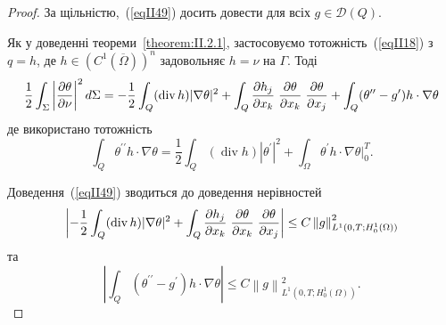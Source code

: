 \begin{proof}
\label{proof:II.lemma.2.2}
За щільністю,~(\ref{eqII49}) досить довести для всіх $g \in \mathcal{D}(Q)$.

Як у доведенні теореми~\ref{theorem:II.2.1}, застосовуємо тотожність~(\ref{eqII18}) з $q=h$, де $h \in (C^1(\overline{\Omega}))^n$ задовольняє
$
h = \nu$ на $\Gamma.
$
Тоді
\begin{align}\label{eqII50}
    \begin{split}
    \frac{1}{2} \int_\Sigma \left| \frac{\partial \theta}{\partial \nu} \right|^2 d\Sigma = -\frac{1}{2} \int_Q (\operatorname{div} h) | \nabla \theta |^2
    + \int_Q \frac{\partial h_j}{\partial x_k} \hspace{0.1cm} \frac{\partial \theta}{\partial x_k} \hspace{0.1cm} \frac{\partial \theta}{\partial x_j} +
    \int_Q (\theta^{\prime \prime} - g^\prime)h \cdot \nabla \theta
    \end{split}
\end{align}
де використано тотожність
\begin{equation*}
\int_Q \theta^{\prime \prime} h \cdot \nabla \theta =  \frac{1}{2} \int_Q (\operatorname{div} h) | \theta^\prime |^2 + \int_\Omega \theta^\prime h \cdot \nabla\theta \Big|_0^T.
\end{equation*}

Доведення~(\ref{eqII49}) зводиться до доведення нерівностей
\begin{align}\label{eqII54}
    \begin{split}
    \left| -\frac{1}{2} \int_Q (\operatorname{div} h) | \nabla \theta |^2 +
    \int_Q \frac{\partial h_j}{\partial x_k} \hspace{0.1cm} \frac{\partial \theta}{\partial x_k} \hspace{0.1cm} \frac{\partial \theta}{\partial x_j} \right| \leq C \left\| g \right\|^2_{L^1(0, T; H_0^1(\Omega))}
    \end{split}
\end{align}
та
\begin{equation}\label{eqII55}
    \left| \int_Q (\theta^{\prime\prime} - g^\prime) h \cdot \nabla \theta \right|
    \leq C \left\| g \right\|^2_{L^1(0, T; H_0^1(\Omega))}.
\end{equation}


\end{proof}
